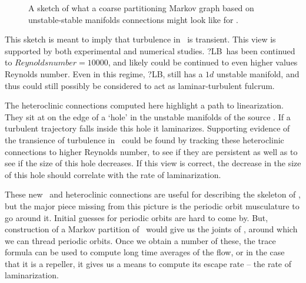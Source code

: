 %
 \begin{figure}
\centering
 \caption[A Markov graph for \KS.]
    {
 A sketch of what a coarse partitioning Markov graph
 based on unstable-stable manifolds connections might
 look like for \KS.}
\label{f:eqvaMarkov}
\end{figure}

This sketch is meant to imply that turbulence in \KS\ is transient.
This view is supported by both experimental
and numerical studies.  ?LB\ has been continued to
$Reynolds number = 10000$, and likely could be continued to
even higher values Reynolds number.  Even in this regime, ?LB, still
has a $1d$ unstable manifold, and thus could still possibly be considered
to act as laminar-turbulent fulcrum.

The heteroclinic connections computed here highlight a path
to linearization.  They sit at on the edge of a `hole' in the unstable
manifolds of the source \eqva.  If a turbulent trajectory falls inside
this hole it laminarizes.  Supporting evidence of the transience of turbulence
in \KS\ could be found by tracking these heteroclinic connections to higher Reynolds number, to see
if they are persistent as well as to see if the size of this hole decreases.
If this view is correct, the decrease in the size of this hole
should correlate with the rate of laminarization.
%

These new \eqva\ and heteroclinic connections are useful for describing the skeleton of \statesp, but
the major piece missing from this picture is the periodic orbit musculature
to go around it.  Initial guesses for periodic orbits are hard to
come by.  But, construction of a Markov partition of \statesp\ would
give us the joints of \statesp, around which we can thread periodic orbits.
Once we obtain a number of these, the trace formula \cite{DasBuch}
can be used to compute long time averages of the flow, or in the case
that it is a repeller, it gives us a means to compute its escape rate --
the rate of laminarization.

